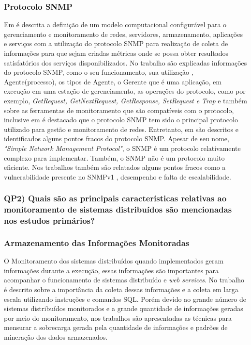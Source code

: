 \subsubsection{Protocolo SNMP}
\label{snmpDescription}

Em \cite{deGeus} é descrita a definição de um modelo computacional configurável para o gerenciamento e monitoramento de redes, servidores, armazenamento, aplicações e serviços com a utilização do protocolo SNMP para realização de coleta de informações para que sejam criadas métricas onde se possa obter resultados satisfatórios dos serviços disponibilizados. No  trabalho \cite{daSilva} são explicadas informações do protocolo SNMP, como o seu funcionamento, sua utilização , Agente(processo), os tipos de Agente, o Gerente que é uma aplicação, em execução em uma estação de gerenciamento, as operações do protocolo, como por exemplo, \textit{GetRequest, 	GetNextRequest,  GetResponse,  SetRequest  e Trap} e também sobre as ferramentas de monitoramento que são compatíveis com o protocolo, inclusive em \cite{Fraga} é destacado que o protocolo SNMP tem sido o principal protocolo utilizado para gestão e monitoramento de redes. Entretanto, em \cite{deMello} são descritos e identificados alguns pontos fracos do protocolo \acrshort{SNMP}. Apesar  de  seu  nome,  \textit{"Simple  Network  Management  Protocol"},  o  SNMP  é  um protocolo  relativamente  complexo  para  implementar.  Também,  o  SNMP  não  é  um protocolo muito eficiente. Nos trabalhos \cite{phan2009cryptanalysis,subramanyan2000scalable} também são relatados alguns pontos fracos como a vulnerabilidade presente no SNMPv1 , desempenho e falta de escalabilidade.

\subsubsection{QP2) Quais são as principais características relativas ao monitoramento de sistemas distribuídos são mencionadas nos estudos primários?}

\subsubsection{Armazenamento das Informações Monitoradas}

O Monitoramento dos sistemas distribuídos quando implementados geram informações durante a execução, essas informações são importantes para acompanhar o funcionamento de sistemas distribuído e \textit{web services}. No trabalho \cite{phan2009cryptanalysis} é descrito sobre a importância da coleta dessas informações e a coleta em larga escala utilizando instruções e comandos SQL. Porém devido ao grande número de sistemas distribuídos monitorados e a grande quantidade de informações geradas por meio do monitoramento, nos trabalhos \cite{abdu1996monitoring,hirate2009profiling} são apresentadas as técnicas para mensurar a sobrecarga gerada pela quantidade de informações e padrões de mineração dos dados armazenados.  

